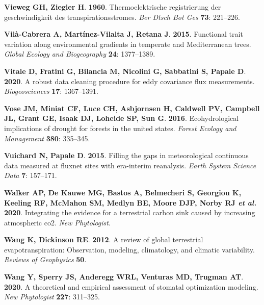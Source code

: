 \documentclass[11pt,twoside]{reedthesis}
\begin{document}
\hypertarget{ref-Vieweg1960}{}
\textbf{\textnormal{Vieweg GH}, \textnormal{Ziegler H}}. \textbf{1960}.
Thermoelektrische registrierung der geschwindigkeit des
transpirationsstromes. \emph{Ber Dtsch Bot Ges} \textbf{73}: 221--226.

\hypertarget{ref-Vila-Cabrera2015}{}
\textbf{\textnormal{Vilà-Cabrera A}, \textnormal{Martínez-Vilalta J},
\textnormal{Retana J}}. \textbf{2015}. Functional trait variation along
environmental gradients in temperate and Mediterranean trees.
\emph{Global Ecology and Biogeography} \textbf{24}: 1377--1389.

\hypertarget{ref-Vitale2020}{}
\textbf{\textnormal{Vitale D}, \textnormal{Fratini G},
\textnormal{Bilancia M}, \textnormal{Nicolini G}, \textnormal{Sabbatini
S}, \textnormal{Papale D}}. \textbf{2020}. A robust data cleaning
procedure for eddy covariance flux measurements. \emph{Biogeosciences}
\textbf{17}: 1367--1391.

\hypertarget{ref-Vose2016}{}
\textbf{\textnormal{Vose JM}, \textnormal{Miniat CF}, \textnormal{Luce
CH}, \textnormal{Asbjornsen H}, \textnormal{Caldwell PV},
\textnormal{Campbell JL}, \textnormal{Grant GE}, \textnormal{Isaak DJ},
\textnormal{Loheide SP}, \textnormal{Sun G}}. \textbf{2016}.
Ecohydrological implications of drought for forests in the united
states. \emph{Forest Ecology and Management} \textbf{380}: 335--345.

\hypertarget{ref-Vuichard2015}{}
\textbf{\textnormal{Vuichard N}, \textnormal{Papale D}}. \textbf{2015}.
Filling the gaps in meteorological continuous data measured at fluxnet
sites with era-interim reanalysis. \emph{Earth System Science Data}
\textbf{7}: 157--171.

\hypertarget{ref-Walker2020}{}
\textbf{\textnormal{Walker AP}, \textnormal{De Kauwe MG},
\textnormal{Bastos A}, \textnormal{Belmecheri S}, \textnormal{Georgiou
K}, \textnormal{Keeling RF}, \textnormal{McMahon SM}, \textnormal{Medlyn
BE}, \textnormal{Moore DJP}, \textnormal{Norby RJ} \emph{et al.}}
\textbf{2020}. Integrating the evidence for a terrestrial carbon sink
caused by increasing atmospheric co2. \emph{New Phytologist}.

\hypertarget{ref-WangDickinson2012}{}
\textbf{\textnormal{Wang K}, \textnormal{Dickinson RE}}. \textbf{2012}.
A review of global terrestrial evapotranspiration: Observation,
modeling, climatology, and climatic variability. \emph{Reviews of
Geophysics} \textbf{50}.

\hypertarget{ref-Wang2020}{}
\textbf{\textnormal{Wang Y}, \textnormal{Sperry JS},
\textnormal{Anderegg WRL}, \textnormal{Venturas MD}, \textnormal{Trugman
AT}}. \textbf{2020}. A theoretical and empirical assessment of stomatal
optimization modeling. \emph{New Phytologist} \textbf{227}: 311--325.
\end{document}
